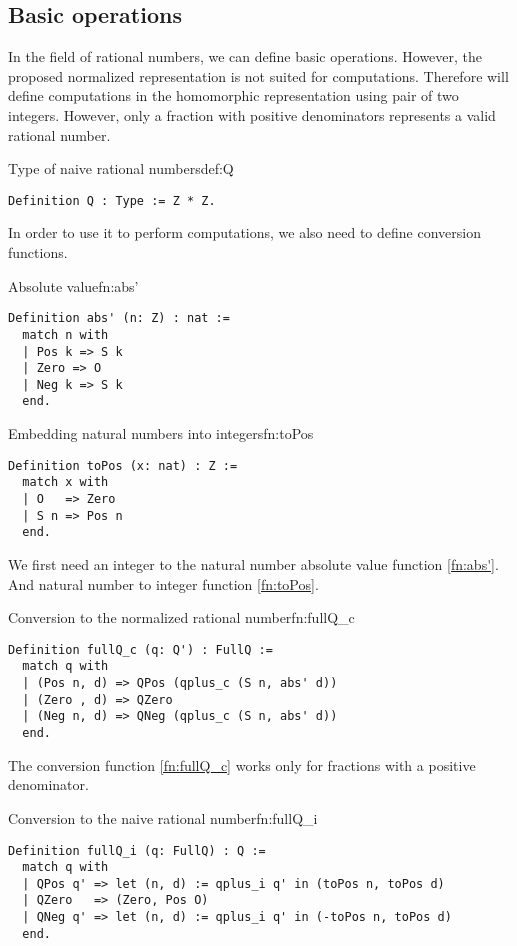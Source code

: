\subsection{Basic operations}
In the field of rational numbers, we can define basic operations. However, the proposed normalized representation is not suited for computations. Therefore will define computations in the homomorphic representation using pair of two integers. However, only a fraction with positive denominators represents a valid rational number.
\begin{defi}{Type of naive rational numbers}{def:Q}
\begin{verbatim}
Definition Q : Type := Z * Z.
\end{verbatim}
\end{defi}
In order to use it to perform computations, we also need to define conversion functions.
\begin{func}{Absolute value}{fn:abs'}
\begin{verbatim}
Definition abs' (n: Z) : nat :=
  match n with
  | Pos k => S k
  | Zero => O
  | Neg k => S k
  end.
\end{verbatim}
\end{func}
\begin{func}{Embedding natural numbers into integers}{fn:toPos}
\begin{verbatim}
Definition toPos (x: nat) : Z :=
  match x with
  | O   => Zero
  | S n => Pos n
  end.
\end{verbatim}
\end{func}
We first need an integer to the natural number absolute value function \ref{fn:abs'}. And natural number to integer function \ref{fn:toPos}.
\begin{func}{Conversion to the normalized rational number}{fn:fullQ_c}
\begin{verbatim}
Definition fullQ_c (q: Q') : FullQ :=
  match q with
  | (Pos n, d) => QPos (qplus_c (S n, abs' d))
  | (Zero , d) => QZero
  | (Neg n, d) => QNeg (qplus_c (S n, abs' d))
  end.
\end{verbatim}
\end{func}
The conversion function \ref{fn:fullQ_c} works only for fractions with a positive denominator.
\begin{func}{Conversion to the naive rational number}{fn:fullQ_i}
\begin{verbatim}
Definition fullQ_i (q: FullQ) : Q :=
  match q with
  | QPos q' => let (n, d) := qplus_i q' in (toPos n, toPos d)
  | QZero   => (Zero, Pos O)
  | QNeg q' => let (n, d) := qplus_i q' in (-toPos n, toPos d)
  end.
\end{verbatim}
\end{func}

